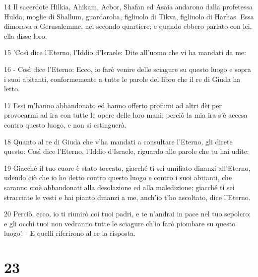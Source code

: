 \par 14 Il sacerdote Hilkia, Ahikam, Acbor, Shafan ed Asaia andarono dalla profetessa Hulda, moglie di Shallum, guardaroba, figliuolo di Tikva, figliuolo di Harhas. Essa dimorava a Gerusalemme, nel secondo quartiere; e quando ebbero parlato con lei, ella disse loro:
\par 15 'Così dice l'Eterno, l'Iddio d'Israele: Dite all'uomo che vi ha mandati da me:
\par 16 - Così dice l'Eterno: Ecco, io farò venire delle sciagure su questo luogo e sopra i suoi abitanti, conformemente a tutte le parole del libro che il re di Giuda ha letto.
\par 17 Essi m'hanno abbandonato ed hanno offerto profumi ad altri dèi per provocarmi ad ira con tutte le opere delle loro mani; perciò la mia ira s'è accesa contro questo luogo, e non si estinguerà.
\par 18 Quanto al re di Giuda che v'ha mandati a consultare l'Eterno, gli direte questo: Così dice l'Eterno, l'Iddio d'Israele, riguardo alle parole che tu hai udite:
\par 19 Giacché il tuo cuore è stato toccato, giacché ti sei umiliato dinanzi all'Eterno, udendo ciò che io ho detto contro questo luogo e contro i suoi abitanti, che saranno cioè abbandonati alla desolazione ed alla maledizione; giacché ti sei stracciate le vesti e hai pianto dinanzi a me, anch'io t'ho ascoltato, dice l'Eterno.
\par 20 Perciò, ecco, io ti riunirò coi tuoi padri, e te n'andrai in pace nel tuo sepolcro; e gli occhi tuoi non vedranno tutte le sciagure ch'io farò piombare su questo luogo'. - E quelli riferirono al re la risposta.

\chapter{23}

